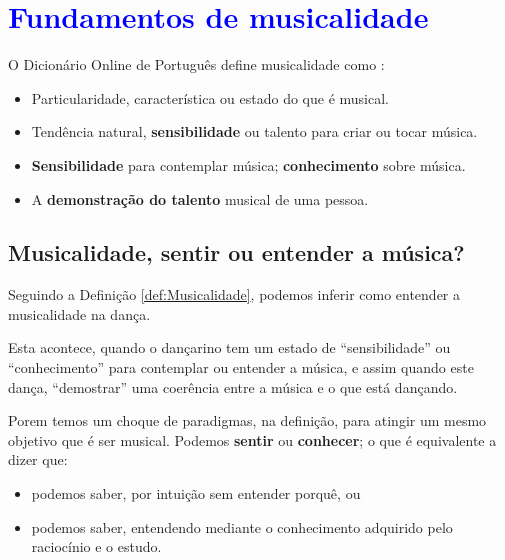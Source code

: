 
\chapter{\textcolor{blue}{Fundamentos de musicalidade}}

\begin{definition}[Musicalidade:] 
\label{def:Musicalidade}
O Dicionário Online de Português define musicalidade como \cite{diciomusicalidade}:
\begin{itemize}
\item Particularidade, característica ou estado do que é musical.
\item Tendência natural, \textbf{sensibilidade} ou talento para criar ou tocar música.
\item \textbf{Sensibilidade} para contemplar música; \textbf{conhecimento} sobre música.
\item A \textbf{demonstração do talento} musical de uma pessoa.
\end{itemize}
\end{definition}




\section{Musicalidade, sentir ou entender a música?}
Seguindo a Definição \ref{def:Musicalidade}, podemos inferir como entender a musicalidade na dança.
\begin{definition} 
\label{def:MusicalidadeNaDanca}
Esta acontece, quando o dançarino tem um estado de ``sensibilidade'' ou ``conhecimento'' para contemplar ou entender a música,
e assim quando este dança, ``demostrar'' uma coerência entre a música e o que está dançando.
\end{definition}

Porem temos um choque de paradigmas, na definição, para atingir um mesmo objetivo que é ser musical.
Podemos \textbf{sentir} ou \textbf{conhecer}; o que é equivalente a dizer que:
\begin{itemize} 
\item podemos saber, por intuição sem entender porquê, ou
\item podemos saber, entendendo mediante o conhecimento adquirido pelo raciocínio e o estudo.\\
\end{itemize}



